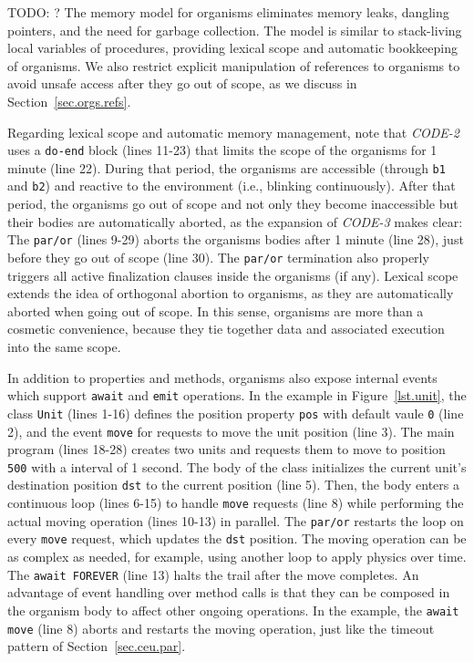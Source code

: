 \documentclass{acm_proc_article-sp}
\newcommand{\code}[1] {{\small{\texttt{#1}}}}
\newcommand{\1}{\;}
\newcommand{\2}{\;\;}
\newcommand{\3}{\;\;\;}
\newcommand{\5}{\;\;\;\;\;}
\begin{document}
TODO: ?
The memory model for organisms eliminates memory leaks, dangling pointers, and 
the need for garbage collection.
%
The model is similar to stack-living local variables of procedures, providing 
lexical scope and automatic bookkeeping of organisms.
We also restrict explicit manipulation of references to organisms to avoid 
unsafe access after they go out of scope, as we discuss in 
Section~\ref{sec.orgs.refs}.

Regarding lexical scope and automatic memory management, note that 
\emph{CODE-2} uses a \code{do-end} block (lines 11-23) that limits the scope of 
the organisms for 1 minute (line 22).
%
During that period, the organisms are accessible (through \code{b1} and 
\code{b2}) and reactive to the environment (i.e., blinking continuously).
%
After that period, the organisms go out of scope and not only they become 
inaccessible but their bodies are automatically aborted, as the expansion of 
\emph{CODE-3} makes clear:
%
The \code{par/or} (lines 9-29) aborts the organisms bodies after 1 minute (line 
28), just before they go out of scope (line 30).
%
The \code{par/or} termination also properly triggers all active finalization 
clauses inside the organisms (if any).
%
Lexical scope extends the idea of orthogonal abortion to organisms, as they are 
automatically aborted when going out of scope.
%
In this sense, organisms are more than a cosmetic convenience, because they tie 
together data and associated execution into the same scope.

In addition to properties and methods, organisms also expose internal events 
which support \code{await} and \code{emit} operations.
%
In the example in Figure~\ref{lst.unit}, the class \code{Unit} (lines 1-16) 
defines the position property \code{pos} with default vaule \code{0} (line 2), 
and the event \code{move} for requests to move the unit position (line 3).
%
The main program (lines 18-28) creates two units and requests them to move to 
position \code{500} with a interval of 1 second.
%
The body of the class initializes the current unit's destination position 
\code{dst} to the current position (line 5).
Then, the body enters a continuous loop (lines 6-15) to handle \code{move} 
requests (line 8) while performing the actual moving operation (lines 10-13) in 
parallel.
The \code{par/or} restarts the loop on every \code{move} request, which updates 
the \code{dst} position.
%
The moving operation can be as complex as needed, for example, using another 
loop to apply physics over time.
The \code{await FOREVER} (line 13) halts the trail after the move completes.
%
An advantage of event handling over method calls is that they can be composed 
in the organism body to affect other ongoing operations.
In the example, the \code{await move} (line 8) aborts and restarts the moving 
operation, just like the timeout pattern of Section~\ref{sec.ceu.par}.
\end{document}
